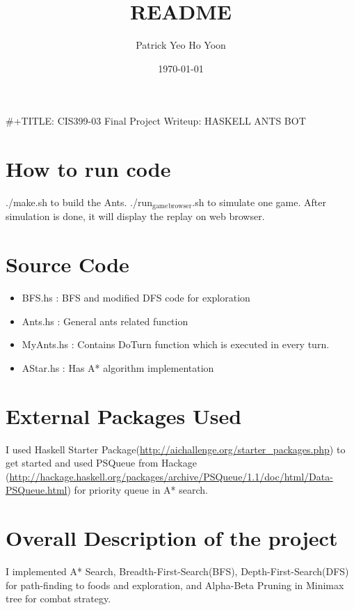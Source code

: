 \documentclass[11pt]{article}
\title{README}
\author{Patrick Yeo Ho Yoon}
\date{\today}
\begin{document}
\maketitle

\setcounter{tocdepth}{3}
\tableofcontents
\vspace*{1cm}
 \#+TITLE: CIS399-03 Final Project Writeup: HASKELL ANTS BOT
 
\section{How to run code}
\label{sec-1}


./make.sh to build the Ants.
./run$_{\mathrm{game}}$$_{\mathrm{browser}}$.sh to simulate one game. After simulation is done, it will display the replay on web browser.
\section{Source Code}
\label{sec-2}


\begin{itemize}
\item BFS.hs : BFS and modified DFS code for exploration
\item Ants.hs : General ants related function
\item MyAnts.hs : Contains DoTurn function which is executed in every turn.
\item AStar.hs : Has A* algorithm implementation
\end{itemize}
 
\section{External Packages Used}
\label{sec-3}


I used Haskell Starter Package(\href{http://aichallenge.org/starter_packages.php}{http://aichallenge.org/starter\_packages.php}) to get started and used PSQueue from Hackage (\href{http://hackage.haskell.org/packages/archive/PSQueue/1.1/doc/html/Data-PSQueue.html}{http://hackage.haskell.org/packages/archive/PSQueue/1.1/doc/html/Data-PSQueue.html}) for priority queue in A* search.
\section{Overall Description of the project}
\label{sec-4}


I implemented A* Search, Breadth-First-Search(BFS), Depth-First-Search(DFS) for path-finding to foods and exploration, and Alpha-Beta Pruning in Minimax tree for combat strategy. 
\end{document}
